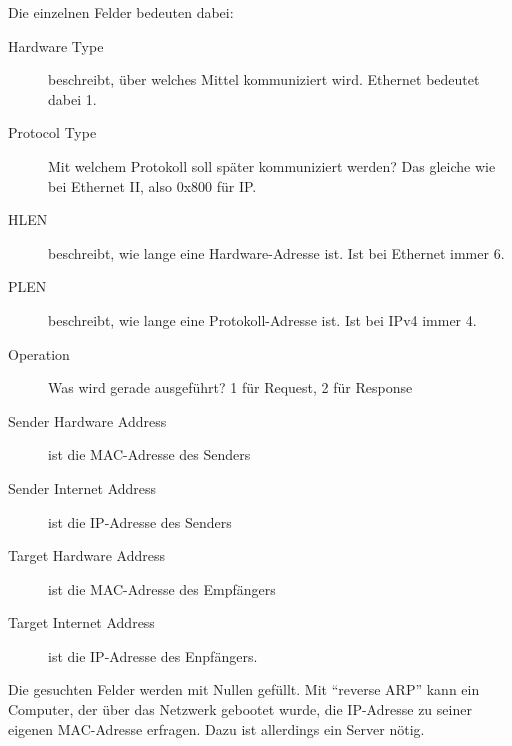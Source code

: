 \documentclass[a4paper,10pt]{scrartcl}
\begin{document}
        Die einzelnen Felder bedeuten dabei:
        \begin{description}
            \item[Hardware Type] beschreibt, über welches Mittel kommuniziert wird. Ethernet bedeutet dabei 1.
            \item[Protocol Type] Mit welchem Protokoll soll später kommuniziert werden? Das gleiche wie bei Ethernet II, also 0x800 für IP.
            \item[HLEN] beschreibt, wie lange eine Hardware-Adresse ist. Ist bei Ethernet immer 6.
            \item[PLEN] beschreibt, wie lange eine Protokoll-Adresse ist. Ist bei IPv4 immer 4.
            \item[Operation] Was wird gerade ausgeführt? 1 für Request, 2 für Response
            \item[Sender Hardware Address] ist die MAC-Adresse des Senders
            \item[Sender Internet Address] ist die IP-Adresse des Senders
            \item[Target Hardware Address] ist die MAC-Adresse des Empfängers
            \item[Target Internet Address] ist die IP-Adresse des Enpfängers.
        \end{description}
        Die gesuchten Felder werden mit Nullen gefüllt. Mit “reverse ARP” kann ein Computer, der über das Netzwerk gebootet wurde, die IP-Adresse zu seiner eigenen MAC-Adresse erfragen. Dazu ist allerdings ein Server nötig.
\end{document}
